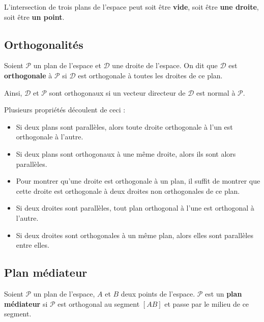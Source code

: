 	\begin{tip}
		L'intersection de trois plans de l'espace peut soit être \textbf{vide}, soit être \textbf{une droite}, soit être \textbf{un point}.
	\end{tip}

	\subsection{Orthogonalités}

	\begin{formula}[Définition]
		Soient $\mathcal{P}$ un plan de l'espace et $\mathcal{D}$ une droite de l'espace. On dit que $\mathcal{D}$ est \textbf{orthogonale} à $\mathcal{P}$ si $\mathcal{D}$ est orthogonale à toutes les droites de ce plan.
	\end{formula}

	\begin{tip}
		Ainsi, $\mathcal{D}$ et $\mathcal{P}$ sont orthogonaux si un vecteur directeur de $\mathcal{D}$ est normal à $\mathcal{P}$.
	\end{tip}

	\begin{tip}[Propriétés]
		Plusieurs propriétés découlent de ceci :
		\begin{itemize}
			\item Si deux plans sont parallèles, alors toute droite orthogonale à l'un est orthogonale à l'autre.
			\item Si deux plans sont orthogonaux à une même droite, alors ils sont alors parallèles.
			\item Pour montrer qu'une droite est orthogonale à un plan, il suffit de montrer que cette droite est orthogonale à deux droites non orthogonales de ce plan.
			\item Si deux droites sont parallèles, tout plan orthogonal à l'une est orthogonal à l'autre.
			\item Si deux droites sont orthogonales à un même plan, alors elles sont parallèles entre elles.
		\end{itemize}
	\end{tip}

	\subsection{Plan médiateur}

	\begin{formula}[Définition]
		Soient $\mathcal{P}$ un plan de l'espace, $A$ et $B$ deux points de l'espace.
		\newpar
		$\mathcal{P}$ est un \textbf{plan médiateur} si $\mathcal{P}$ est orthogonal au segment $[AB]$ et passe par le milieu de ce segment.
	\end{formula}

